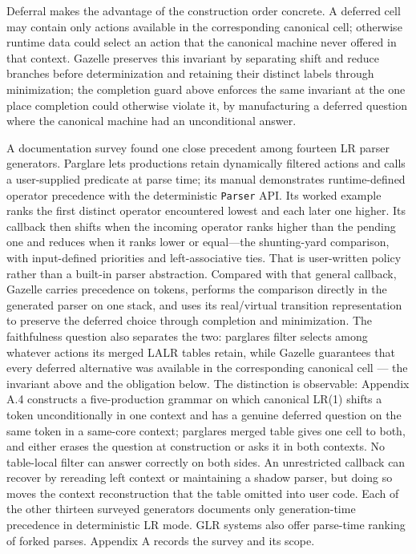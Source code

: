 \documentclass[
  10pt,
]{article}
\begin{document}
Deferral makes the advantage of the construction order concrete. A
deferred cell may contain only actions available in the corresponding
canonical cell; otherwise runtime data could select an action that the
canonical machine never offered in that context. Gazelle preserves this
invariant by separating shift and reduce branches before determinization
and retaining their distinct labels through minimization; the completion
guard above enforces the same invariant at the one place completion
could otherwise violate it, by manufacturing a deferred question where
the canonical machine had an unconditional answer.

A documentation survey found one close precedent among fourteen LR
parser generators. Parglare lets productions retain dynamically filtered
actions and calls a user-supplied predicate at parse time; its manual
demonstrates runtime-defined operator precedence with the deterministic
\texttt{Parser} API. Its worked example ranks the first distinct
operator encountered lowest and each later one higher. Its callback then
shifts when the incoming operator ranks higher than the pending one and
reduces when it ranks lower or equal---the shunting-yard comparison,
with input-defined priorities and left-associative ties. That is
user-written policy rather than a built-in parser abstraction. Compared
with that general callback, Gazelle carries precedence on tokens,
performs the comparison directly in the generated parser on one stack,
and uses its real/virtual transition representation to preserve the
deferred choice through completion and minimization. The faithfulness
question also separates the two: parglare\textquotesingle s filter
selects among whatever actions its merged LALR tables retain, while
Gazelle guarantees that every deferred alternative was available in the
corresponding canonical cell --- the invariant above and the obligation
below. The distinction is observable: Appendix A.4 constructs a
five-production grammar on which canonical LR(1) shifts a token
unconditionally in one context and has a genuine deferred question on
the same token in a same-core context; parglare\textquotesingle s merged
table gives one cell to both, and either erases the question at
construction or asks it in both contexts. No table-local filter can
answer correctly on both sides. An unrestricted callback can recover by
rereading left context or maintaining a shadow parser, but doing so
moves the context reconstruction that the table omitted into user code.
Each of the other thirteen surveyed generators documents only
generation-time precedence in deterministic LR mode. GLR systems also
offer parse-time ranking of forked parses. Appendix A records the survey
and its scope.
\end{document}

